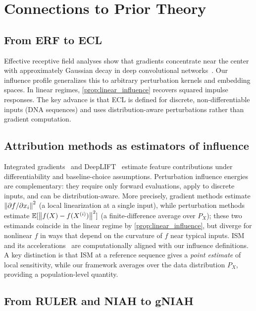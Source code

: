\section{Connections to Prior Theory}\label{sec:connections}

\subsection{From ERF to ECL}

Effective receptive field analyses show that gradients concentrate near the center with approximately Gaussian decay in deep convolutional networks~\citep{Luo2016EffectiveRF}. Our influence profile generalizes this to arbitrary perturbation kernels and embedding spaces. In linear regimes, \cref{prop:linear_influence} recovers squared impulse responses. The key advance is that ECL is defined for discrete, non-differentiable inputs (DNA sequences) and uses distribution-aware perturbations rather than gradient computation.

\subsection{Attribution methods as estimators of influence}

Integrated gradients~\citep{Sundararajan2017IG} and DeepLIFT~\citep{Shrikumar2017DeepLIFT} estimate feature contributions under differentiability and baseline-choice assumptions. Perturbation influence energies are complementary: they require only forward evaluations, apply to discrete inputs, and can be distribution-aware. More precisely, gradient methods estimate $\left\lVert \partial f/\partial x_i \right\rVert^2$ (a local linearization at a single input), while perturbation methods estimate $\mathbb{E}[\left\lVert f(X) - f(X^{(i)}) \right\rVert^2]$ (a finite-difference average over $P_X$); these two estimands coincide in the linear regime by \cref{prop:linear_influence}, but diverge for nonlinear $f$ in ways that depend on the curvature of $f$ near typical inputs. ISM and its accelerations~\citep{Nair2022fastISM,Schreiber2022Yuzu} are computationally aligned with our influence definitions. A key distinction is that ISM at a reference sequence gives a \emph{point estimate} of local sensitivity, while our framework averages over the data distribution $P_X$, providing a population-level quantity.

\subsection{From RULER and NIAH to gNIAH}

